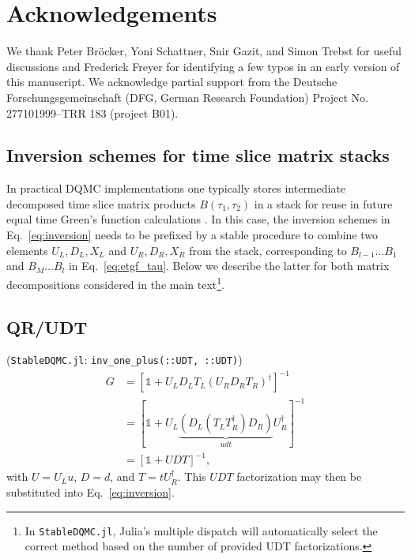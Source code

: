 \documentclass[submission, Phys]{SciPost}
\begin{document}
\section*{Acknowledgements}
We thank Peter Bröcker, Yoni Schattner, Snir Gazit, and Simon Trebst for useful discussions and Frederick Freyer for identifying a few typos in an early version of this manuscript. We acknowledge partial support from the Deutsche Forschungsgemeinschaft (DFG, German Research Foundation) Project No. 277101999–TRR 183 (project B01).


\begin{appendix}

\section{Inversion schemes for time slice matrix stacks}

In practical DQMC implementations one typically stores intermediate decomposed time slice matrix products $B(\tau_1, \tau_2)$ in a stack for reuse in future equal time Green's function calculations \cite{Assaad2002a, Santos2003, Broecker2016}. In this case, the inversion schemes in Eq.~\eqref{eq:inversion} needs to be prefixed by a stable procedure to combine two elements $U_L, D_L, X_L$ and $U_R, D_R, X_R$ from the stack, corresponding to $B_{l-1}\dots B_1$ and $B_M \dots B_l$ in Eq.~\ref{eq:etgf_tau}. Below we describe the latter for both matrix decompositions considered in the main text\footnote{In \texttt{StableDQMC.jl}, Julia's multiple dispatch will automatically select the correct method based on the number of provided UDT factorizations.}.

\subsection{QR/UDT}

(\texttt{StableDQMC.jl}: \texttt{inv\_one\_plus(::UDT, ::UDT)})
\begin{align}
	G &= \left[\mathbb{1} + U_L D_L T_L \left( U_R D_R T_R \right)^\dagger \right]^{-1}\nonumber \\
	&= \left[\mathbb{1} + U_L \underbrace{\left( D_L \left( T_L T_R^\dagger \right) D_R \right)}_{udt} U_R^\dagger \right]^{-1} \\
	&= \left[\mathbb{1} + U D T \right]^{-1},\nonumber
\end{align}
with $U=U_Lu$, $D=d$, and $T=tU_R^\dagger$. This $UDT$ factorization may then be substituted into Eq.~\eqref{eq:inversion}.



\end{appendix}
\end{document}
